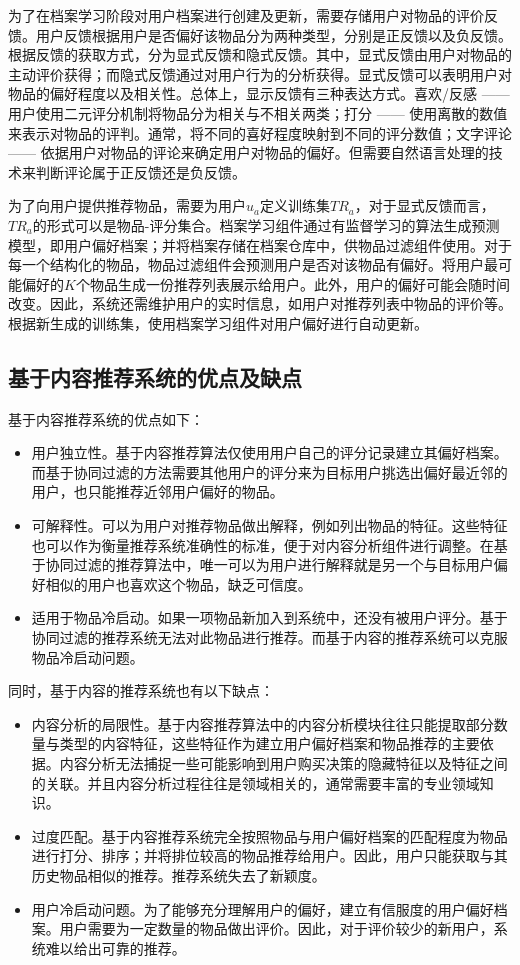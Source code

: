 为了在档案学习阶段对用户档案进行创建及更新，需要存储用户对物品的评价反馈。用户反馈根据用户是否偏好该物品分为两种类型，分别是正反馈以及负反馈。根据反馈的获取方式，分为显式反馈和隐式反馈。其中，显式反馈由用户对物品的主动评价获得；而隐式反馈通过对用户行为的分析获得。显式反馈可以表明用户对物品的偏好程度以及相关性。总体上，显示反馈有三种表达方式。喜欢/反感 —— 用户使用二元评分机制将物品分为相关与不相关两类；打分 —— 使用离散的数值来表示对物品的评判。通常，将不同的喜好程度映射到不同的评分数值；文字评论 —— 依据用户对物品的评论来确定用户对物品的偏好。但需要自然语言处理的技术来判断评论属于正反馈还是负反馈。

为了向用户提供推荐物品，需要为用户$u_a$定义训练集$TR_a$，对于显式反馈而言，$TR_a$的形式可以是物品-评分集合。档案学习组件通过有监督学习的算法生成预测模型，即用户偏好档案；并将档案存储在档案仓库中，供物品过滤组件使用。对于每一个结构化的物品，物品过滤组件会预测用户是否对该物品有偏好。将用户最可能偏好的$K$个物品生成一份推荐列表展示给用户。此外，用户的偏好可能会随时间改变。因此，系统还需维护用户的实时信息，如用户对推荐列表中物品的评价等。根据新生成的训练集，使用档案学习组件对用户偏好进行自动更新。

\subsection{基于内容推荐系统的优点及缺点}

基于内容推荐系统的优点如下：

\begin{itemize}
 \item 用户独立性。基于内容推荐算法仅使用用户自己的评分记录建立其偏好档案。而基于协同过滤的方法需要其他用户的评分来为目标用户挑选出偏好最近邻的用户，也只能推荐近邻用户偏好的物品。
 \item 可解释性。可以为用户对推荐物品做出解释，例如列出物品的特征。这些特征也可以作为衡量推荐系统准确性的标准，便于对内容分析组件进行调整。在基于协同过滤的推荐算法中，唯一可以为用户进行解释就是另一个与目标用户偏好相似的用户也喜欢这个物品，缺乏可信度。
 \item 适用于物品冷启动。如果一项物品新加入到系统中，还没有被用户评分。基于协同过滤的推荐系统无法对此物品进行推荐。而基于内容的推荐系统可以克服物品冷启动问题。
\end{itemize}

同时，基于内容的推荐系统也有以下缺点：

\begin{itemize}
	\item 内容分析的局限性。基于内容推荐算法中的内容分析模块往往只能提取部分数量与类型的内容特征，这些特征作为建立用户偏好档案和物品推荐的主要依据。内容分析无法捕捉一些可能影响到用户购买决策的隐藏特征以及特征之间的关联。并且内容分析过程往往是领域相关的，通常需要丰富的专业领域知识。
	\item 过度匹配。基于内容推荐系统完全按照物品与用户偏好档案的匹配程度为物品进行打分、排序；并将排位较高的物品推荐给用户。因此，用户只能获取与其历史物品相似的推荐。推荐系统失去了新颖度。
	\item 用户冷启动问题。为了能够充分理解用户的偏好，建立有信服度的用户偏好档案。用户需要为一定数量的物品做出评价。因此，对于评价较少的新用户，系统难以给出可靠的推荐。
\end{itemize}

